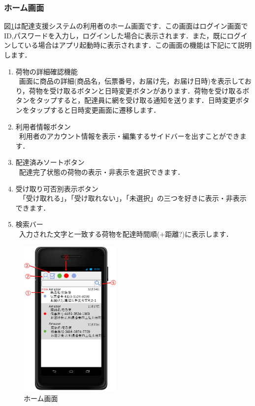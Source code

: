 \documentclass[a4j,titlepage]{jarticle}
\begin{document}
\subsubsection{ホーム画面}
図\ref{fig:user_home}は配達支援システムの利用者のホーム画面です．この画面はログイン画面でID,パスワードを入力し，ログインした場合に表示されます．また，既にログインしている場合はアプリ起動時に表示されます．この画面の機能は下記にて説明します．
\begin{enumerate}
	\item 荷物の詳細確認機能\\
	 \ 画面に商品の詳細(商品名，伝票番号，お届け先，お届け日時)を表示しており，荷物を受け取るボタンと日時変更ボタンがあります．荷物を受け取るボタンをタップすると，配達員に網を受け取る通知を送ります．日時変更ボタンをタップすると日時変更画面に遷移します．
	\item 利用者情報ボタン\\
	 \ 利用者のアカウント情報を表示・編集するサイドバーを出すことができます．

	\item 配達済みソートボタン\\
   \ 配達完了状態の荷物の表示・非表示を選択できます．

	\item 受け取り可否別表示ボタン\\
	 \ 「受け取れる」，「受け取れない」，「未選択」の三つを好きに表示・非表示できます．

	\item 検索バー\\
	 \ 入力された文字と一致する荷物を配達時間順(+距離?)に表示します．

\end{enumerate}

\begin{figure}[H]
 \begin{center}
  \includegraphics[width=50mm]{user_home.png}
	\caption{ホーム画面}
	\label{fig:user_home}
 \end{center}

\end{figure}
\newpage
\end{document}
